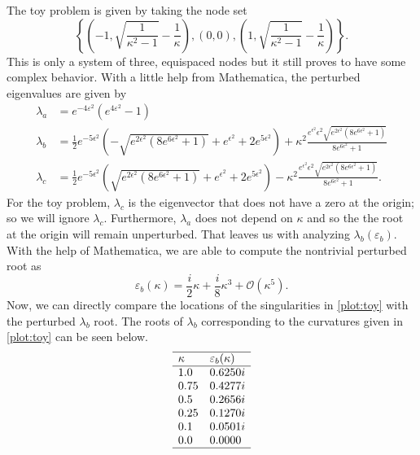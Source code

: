 \documentclass[a4paper,11pt]{article}
\newcommand{\eps}{\varepsilon}
\newcommand{\bigO}{\mathcal{O}}
\begin{document}
The toy problem is given by taking the node set
\[
	\left\{\left(-1, \sqrt{\frac{1}{\kappa^2 - 1}} - \frac{1}{\kappa}\right), (0, 0), \left(1, \sqrt{\frac{1}{\kappa^2 - 1}} - \frac{1}{\kappa}\right)\right\}.
\]
This is only a system of three, equispaced nodes but it still proves to have some complex behavior. With a little help from Mathematica, the perturbed eigenvalues are given by
\begin{align*}
	\lambda_a &= e^{-4 \eps ^2} \left(e^{4 \eps ^2}-1\right) \\
	\lambda_b &= \frac{1}{2} e^{-5 \epsilon ^2} \left(-\sqrt{e^{2 \epsilon ^2} \left(8 e^{6 \epsilon ^2}+1\right)}+e^{\epsilon ^2}+2 e^{5 \epsilon ^2}\right) + \kappa ^2\frac{e^{\epsilon ^2} \epsilon ^2 \sqrt{e^{2 \epsilon ^2} \left(8 e^{6 \epsilon ^2}+1\right)}}{8 e^{6 \epsilon ^2}+1} \\
	\lambda_c &= \frac{1}{2} e^{-5 \epsilon ^2} \left(\sqrt{e^{2 \epsilon ^2} \left(8 e^{6 \epsilon ^2}+1\right)}+e^{\epsilon ^2}+2 e^{5 \epsilon ^2}\right) - \kappa^2\frac{e^{\epsilon ^2}  \epsilon ^2 \sqrt{e^{2 \epsilon ^2} \left(8 e^{6 \epsilon ^2}+1\right)}}{8 e^{6 \epsilon ^2}+1}.
\end{align*}
For the toy problem, $ \lambda_c $ is the eigenvector that does not have a zero at the origin; so we will ignore $ \lambda_c $. Furthermore, $ \lambda_a $ does not depend on $ \kappa $ and so the the root at the origin will remain unperturbed. That leaves us with analyzing $ \lambda_b(\eps_b) $. With the help of Mathematica, we are able to compute the nontrivial perturbed root as 
\[
	\eps_b(\kappa) = \frac{i}{2} \kappa + \frac{i}{8} \kappa^3 + \bigO(\kappa^5).
\]
Now, we can directly compare the locations of the singularities in \autoref{plot:toy} with the perturbed $ \lambda_b $ root. The roots of $ \lambda_b $ corresponding to the curvatures given in \autoref{plot:toy} can be seen below.
\[
	\begin{array}{ll}
		\hline
		\kappa & \eps_b(\kappa) \\
		\hline
		1.0 & 0.6250i \\
		0.75 & 0.4277i \\
		0.5 & 0.2656i \\
		0.25 & 0.1270i \\
		0.1 & 0.0501i \\
		0.0 & 0.0000 \\
		\hline
	\end{array}
\]
\end{document}
